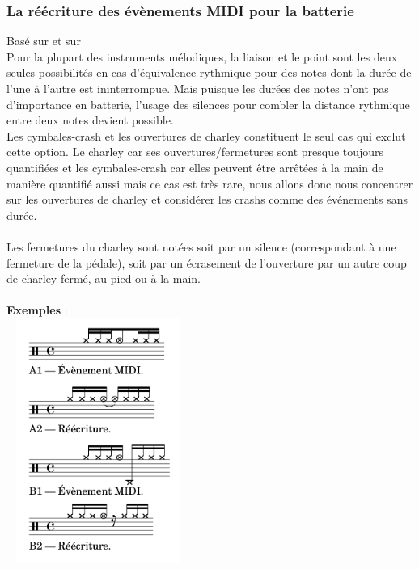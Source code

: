 \subsubsection*{La réécriture des évènements MIDI pour la batterie}
Basé sur \cite{jacquemard:hal-01134096} et sur \cite{jacquemard:hal-01403982}\\
Pour la plupart des instruments mélodiques, la liaison et le point sont les deux seules possibilités en cas d’équivalence rythmique pour des notes dont la durée de l’une à l’autre est ininterrompue. Mais puisque les durées des notes n’ont pas d’importance en batterie, l’usage des silences pour combler la distance rythmique entre deux notes devient possible.\\Les cymbales-crash et les ouvertures de charley constituent le seul cas qui exclut cette option. Le charley car ses ouvertures/fermetures sont presque toujours quantifiées et les cymbales-crash car elles peuvent être arrêtées à la main de manière quantifié aussi mais ce cas est très rare, nous allons donc nous concentrer sur les ouvertures de charley et considérer les crashs comme des événements sans durée.\\\\
Les fermetures du charley sont notées soit par un silence (correspondant à une fermeture de la pédale), soit par un écrasement de l’ouverture par un autre coup de charley fermé, au pied ou à la main.\\\\
\textbf{Exemples} :\\
\includegraphics[height=80mm, width=60mm]{z_images/reecriture/exemples_charley_1.png}\\\\

